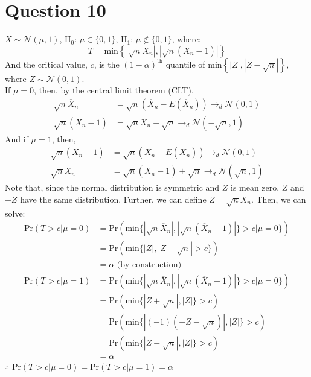 \documentclass{article}
\newcommand{\N}{\mathcal{N}}
\newcommand{\olx}[1]{\overline{X}_{#1}}
\renewcommand{\Pr}[1]{\text{Pr}\left(#1\right)}
\begin{document}
\section*{Question 10}
$X\sim\N(\mu,1)$, H$_0$: $\mu\in\{0,1\}$, H$_1$: $\mu\notin\{0,1\}$, where:
\[
	T = \text{min}\left\{|\sqrt{n}\olx{n}|,|\sqrt{n}(\olx{n}-1)|\right\}
\]
And the critical value, $c$, is the $(1-\alpha)^\text{th}$ quantile of ${\text{min}\left\{|Z|,|Z-\sqrt{n}|\right\}}$, where $Z\sim\N(0,1)$.
\medskip \\
If $\mu=0$, then, by the central limit theorem (CLT),
\begin{align*}
	\sqrt{n}\olx{n} 	&= \sqrt{n}(\olx{n}-E(\olx{n}))\rightarrow_d\N(0,1) 			\\
	\sqrt{n}(\olx{n}-1) &= \sqrt{n}\olx{n} - \sqrt{n}\rightarrow_d\N(-\sqrt{n},1)
\end{align*}
And if $\mu=1$, then,
\begin{align*}
	\sqrt{n}(\olx{n}-1) &= \sqrt{n}(\olx{n}-E(\olx{n}))\rightarrow_d\N(0,1) 			\\
	\sqrt{n}\olx{n}		&= \sqrt{n}(\olx{n}-1) + \sqrt{n}\rightarrow_d\N(\sqrt{n},1)
\end{align*}
Note that, since the normal distribution is symmetric and $Z$ is mean zero, $Z$ and $-Z$ have the same distribution. Further, we can define $Z=\sqrt{n}\olx{n}$. Then, we can solve:
\begin{align*}
	\Pr{T>c|\mu=0}	&= \Pr{\text{min}\{|\sqrt{n}\olx{n}|,|\sqrt{n}(\olx{n}-1)|\}>c|\mu=0\}}	\\
					&= \Pr{\text{min}\{|Z|,|Z-\sqrt{n}|>c\}}								\\
					&= \alpha \text{ (by construction)}										\\
	\Pr{T>c|\mu=1}	&= \Pr{\text{min}\{|\sqrt{n}\olx{n}|,|\sqrt{n}(\olx{n}-1)|\}>c|\mu=0\}}	\\
					&= \Pr{\text{min}\{|Z+\sqrt{n}|,|Z|\}>c}								\\
					&= \Pr{\text{min}\{|(-1)(-Z-\sqrt{n})|,|Z|\}>c}							\\
					&= \Pr{\text{min}\{|Z-\sqrt{n}|,|Z|\}>c}								\\
					&= \alpha
\end{align*}
$\therefore$ $\Pr{T>c|\mu=0}=\Pr{T>c|\mu=1}=\alpha$


\end{document}

